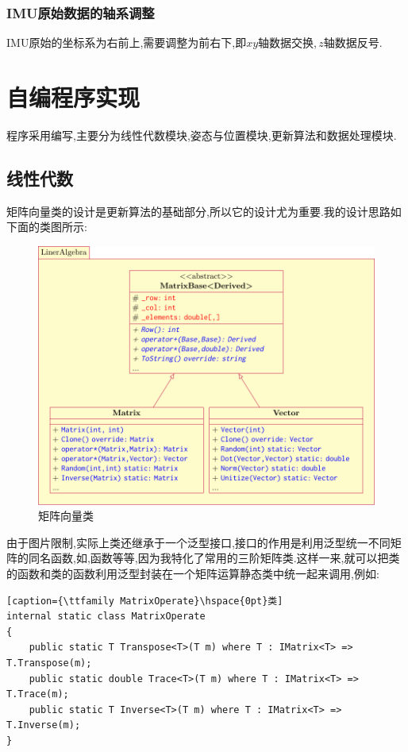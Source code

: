 \documentclass[10pt,a4paper]{ctexart}
\begin{document}
\subsubsection*{IMU原始数据的轴系调整}
IMU原始的坐标系为右前上,需要调整为前右下,即$xy$轴数据交换,\,$z$轴数据反号.

\section{自编程序实现}
程序采用编写,主要分为线性代数模块,姿态与位置模块,更新算法和数据处理模块.
\subsection{线性代数}
矩阵向量类的设计是更新算法的基础部分,所以它的设计尤为重要.我的设计思路如下面的类图所示:
\begin{figure}[H]
\centering
\includegraphics[scale=0.9]{Figures/MatrixClass.pdf}
\caption{矩阵向量类}
\label{fig:MatrixBaseClass}
\end{figure}
\noindent 由于图片限制,实际上类还继承于一个泛型接口,接口的作用是利用泛型统一不同矩阵的同名函数,如,函数等等,因为我特化了常用的三阶矩阵类.这样一来,就可以把类的函数和类的函数利用泛型封装在一个矩阵运算静态类中统一起来调用,例如:
\begin{lstlisting}[caption={\ttfamily MatrixOperate}\hspace{0pt}类]
internal static class MatrixOperate
{
    public static T Transpose<T>(T m) where T : IMatrix<T> => T.Transpose(m);
    public static double Trace<T>(T m) where T : IMatrix<T> => T.Trace(m);
    public static T Inverse<T>(T m) where T : IMatrix<T> => T.Inverse(m);
}
\end{lstlisting}
\end{document}
